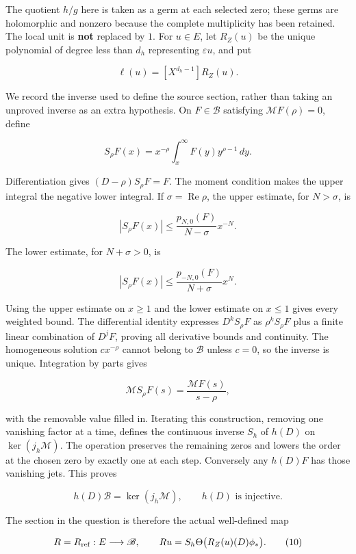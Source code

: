 The quotient \(h/g\) here is taken as a germ at each selected zero;
these germs are holomorphic and nonzero because the complete
multiplicity has been retained. The local unit is \textbf{not} replaced
by \(1\). For \(u\in E\), let \(R_Z(u)\) be the unique polynomial of
degree less than \(d_h\) representing \(\varepsilon u\), and put

\[\ell(u)=[X^{d_h-1}]R_Z(u).\tag{8}\]

We record the inverse used to define the source section, rather than
taking an unproved inverse as an extra hypothesis. On \(F\in\mathscr B\)
satisfying \(\mathcal MF(\rho)=0\), define

\[S_\rho F(x)=x^{-\rho}\int_x^\infty F(y)y^{\rho-1}\,dy.\]

Differentiation gives \((D-\rho)S_\rho F=F\). The moment condition makes
the upper integral the negative lower integral. If
\(\sigma=\operatorname{Re}\rho\), the upper estimate, for \(N>\sigma\),
is

\[|S_\rho F(x)|\leq \frac{p_{N,0}(F)}{N-\sigma}x^{-N}.\]

The lower estimate, for \(N+\sigma>0\), is

\[|S_\rho F(x)|\leq \frac{p_{-N,0}(F)}{N+\sigma}x^{N}.\]

Using the upper estimate on \(x\geq1\) and the lower estimate on
\(x\leq1\) gives every weighted bound. The differential identity
expresses \(D^kS_\rho F\) as \(\rho^kS_\rho F\) plus a finite linear
combination of \(D^jF\), proving all derivative bounds and continuity.
The homogeneous solution \(cx^{-\rho}\) cannot belong to \(\mathscr B\)
unless \(c=0\), so the inverse is unique. Integration by parts gives

\[\mathcal MS_\rho F(s)=\frac{\mathcal MF(s)}{s-\rho},\]

with the removable value filled in. Iterating this construction,
removing one vanishing factor at a time, defines the continuous inverse
\(S_h\) of \(h(D)\) on \(\ker(j_h\mathcal M)\). The operation preserves
the remaining zeros and lowers the order at the chosen zero by exactly
one at each step. Conversely any \(h(D)F\) has those vanishing jets.
This proves

\[h(D)\mathscr B=\ker(j_h\mathcal M),\qquad h(D)\text{ is injective}.\tag{9}\]

The section in the question is therefore the actual well-defined map

\[R=R_{\rm ref}:E\longrightarrow\mathscr B,\qquad
Ru=S_h\Theta\bigl(R_Z(u)(D)\phi_*\bigr).\tag{10}\]

